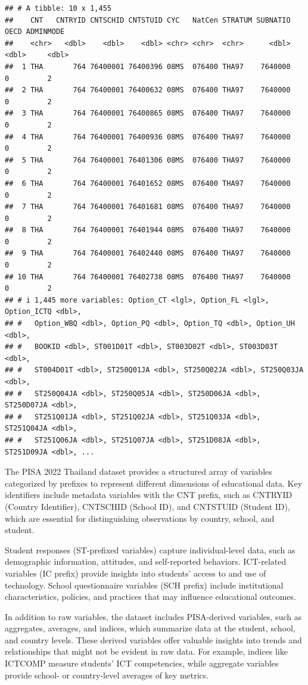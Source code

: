 \documentclass[
]{article}
\begin{document}
\begin{verbatim}
## # A tibble: 10 x 1,455
##    CNT   CNTRYID CNTSCHID CNTSTUID CYC   NatCen STRATUM SUBNATIO  OECD ADMINMODE
##    <chr>   <dbl>    <dbl>    <dbl> <chr> <chr>  <chr>      <dbl> <dbl>     <dbl>
##  1 THA       764 76400001 76400396 08MS  076400 THA97    7640000     0         2
##  2 THA       764 76400001 76400632 08MS  076400 THA97    7640000     0         2
##  3 THA       764 76400001 76400865 08MS  076400 THA97    7640000     0         2
##  4 THA       764 76400001 76400936 08MS  076400 THA97    7640000     0         2
##  5 THA       764 76400001 76401306 08MS  076400 THA97    7640000     0         2
##  6 THA       764 76400001 76401652 08MS  076400 THA97    7640000     0         2
##  7 THA       764 76400001 76401681 08MS  076400 THA97    7640000     0         2
##  8 THA       764 76400001 76401944 08MS  076400 THA97    7640000     0         2
##  9 THA       764 76400001 76402440 08MS  076400 THA97    7640000     0         2
## 10 THA       764 76400001 76402738 08MS  076400 THA97    7640000     0         2
## # i 1,445 more variables: Option_CT <lgl>, Option_FL <lgl>, Option_ICTQ <dbl>,
## #   Option_WBQ <dbl>, Option_PQ <dbl>, Option_TQ <dbl>, Option_UH <dbl>,
## #   BOOKID <dbl>, ST001D01T <dbl>, ST003D02T <dbl>, ST003D03T <dbl>,
## #   ST004D01T <dbl>, ST250Q01JA <dbl>, ST250Q02JA <dbl>, ST250Q03JA <dbl>,
## #   ST250Q04JA <dbl>, ST250Q05JA <dbl>, ST250D06JA <dbl>, ST250D07JA <dbl>,
## #   ST251Q01JA <dbl>, ST251Q02JA <dbl>, ST251Q03JA <dbl>, ST251Q04JA <dbl>,
## #   ST251Q06JA <dbl>, ST251Q07JA <dbl>, ST251D08JA <dbl>, ST251D09JA <dbl>, ...
\end{verbatim}

The PISA 2022 Thailand dataset provides a structured array of variables
categorized by prefixes to represent different dimensions of educational
data. Key identifiers include metadata variables with the CNT prefix,
such as CNTRYID (Country Identifier), CNTSCHID (School ID), and CNTSTUID
(Student ID), which are essential for distinguishing observations by
country, school, and student.

Student responses (ST-prefixed variables) capture individual-level data,
such as demographic information, attitudes, and self-reported behaviors.
ICT-related variables (IC prefix) provide insights into students' access
to and use of technology. School questionnaire variables (SCH prefix)
include institutional characteristics, policies, and practices that may
influence educational outcomes.

In addition to raw variables, the dataset includes PISA-derived
variables, such as aggregates, averages, and indices, which summarize
data at the student, school, and country levels. These derived variables
offer valuable insights into trends and relationships that might not be
evident in raw data. For example, indices like ICTCOMP measure students'
ICT competencies, while aggregate variables provide school- or
country-level averages of key metrics.
\end{document}
